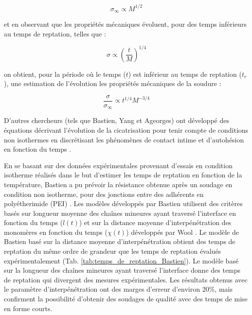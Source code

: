\begin{equation}
\sigma_{\infty} \propto M^{1/2}
\end{equation}

et en observant que les propriétés mécaniques évoluent, pour des temps inférieurs au temps de reptation, telles que \cite{Wool1983} :

\begin{equation}
\sigma \propto \left( \frac{t}{M} \right) ^{1/4}
\end{equation}

on obtient, pour la période où le temps ($t$) est inférieur au temps de reptation ($t_r$), une estimation de l'évolution les propriétés mécaniques de la soudure \cite{Wool1983} : 

\begin{equation}
\frac{\sigma}{\sigma_{\infty}} \propto t^{1/4} M^{-3/4}
\end{equation}

D'autres chercheurs (tels que Bastien, Yang et Ageorges) ont développé des équations décrivant l'évolution de la cicatrisation pour tenir compte de conditions non isothermes en discrétisant les phénomènes de contact intime et d'autohésion en fonction du temps  \cite{Bastien1991,F.Yang2002,Ageorges1998}. 

En se basant sur des données expérimentales provenant d'essais en condition isotherme réalisés dans le but d'estimer les temps de reptation en fonction de la température, Bastien a pu prévoir la résistance obtenue après un soudage en condition non isotherme, pour des jonctions entre des adhérents en polyétherimide (PEI) \cite{Bastien1991}. 
Les modèles développés par Bastien utilisent des critères basés sur longueur moyenne des chaînes mineures ayant traversé l'interface en fonction du temps ($l(t)$) et sur la distance moyenne d'interpénétration des monomères en fonction du temps ($\chi(t)$) développés par Wool \cite{Wool1983}. 
Le modèle de Bastien basé sur la distance moyenne d'interpénétration obtient des temps de reptation du même ordre de grandeur que les temps de reptation évalués expérimentalement (Tab. \ref{tab:temps_de_reptation_Bastien}). 
Le modèle basé sur la longueur des chaînes mineures ayant traversé l'interface donne des temps de reptation qui divergent des mesures expérimentales. 
Les résultats obtenus avec le paramètre d'interpénétration ont des marges d'erreur d'environ 20\%, mais confirment la possibilité d'obtenir des soudages de qualité avec des temps de mise en forme courts.

